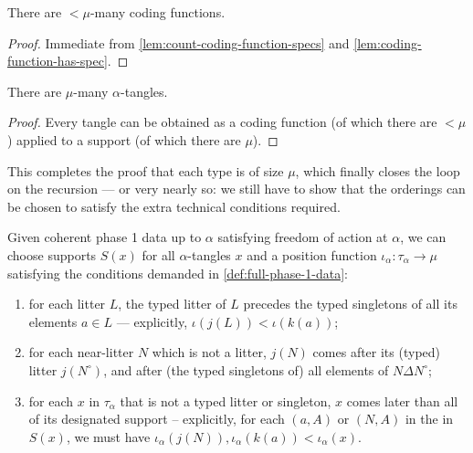 \begin{corollary}
  \label{cor:count-coding-functions}
  There are $<\mu$-many coding functions.
\end{corollary}

\begin{proof}
  Immediate from \cref{lem:count-coding-function-specs} and \cref{lem:coding-function-has-spec}.
\end{proof}

\begin{corollary}
  \label{cor:count-tangles}
  There are $\mu$-many $\alpha$-tangles.
\end{corollary}

\begin{proof}
  Every tangle can be obtained as a coding function (of which there are $<\mu$) applied to a support (of which there are $\mu$).
\end{proof}

This completes the proof that each type is of size $\mu$, which finally closes the loop on the recursion --- or very nearly so: we still have to show that the orderings can be chosen to satisfy the extra technical conditions required.

\begin{lemma}
  \label{lem:position-functions-propagate}
  Given coherent phase 1 data up to $\alpha$ satisfying freedom of action at $\alpha$, we can choose supports $S(x)$ for all $\alpha$-tangles $x$ and a position function $\iota_\alpha : \tau_\alpha \to \mu$ satisfying the conditions demanded in \cref{def:full-phase-1-data}:
  \begin{enumerate}
    \item for each litter $L$, the typed litter of $L$ precedes the typed singletons of all its elements $a \in L$ --- explicitly, $\iota(j(L)) < \iota(k(a))$;
    \item for each near-litter $N$ which is not a litter, $j(N)$ comes after its (typed) litter $j(N^\circ)$, and after (the typed singletons of) all elements of $N \Delta N^\circ$;

    \item for each $x$ in $\tau_\alpha$ that is not a typed litter or singleton, $x$ comes later than all of its designated support -- explicitly, for each $(a,A)$ or $(N,A)$ in the in $S(x)$, we must have $\iota_\alpha(j(N)), \iota_\alpha(k(a))<\iota_\alpha(x)$.
  \end{enumerate}
\end{lemma}

